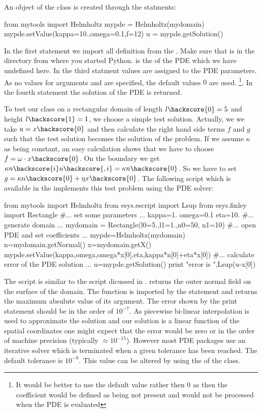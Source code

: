 An object of the  class is created through the statments:
\begin{python}
from mytools import Helmholtz
mypde = Helmholtz(mydomain)
mypde.setValue(kappa=10.,omega=0.1,f=12)
u = mypde.getSolution()
\end{python}
In the first statement we import all definition from the  . Make sure
that  is in the directory from where you started Python.
 is the \Domain of the PDE which we have undefined here. In the third statment values are
assigned to the PDE parameters. As no values for arguments  and  are
specified, the default values $0$ are used. \footnote{It would be better to use the default value 
 rather then $0$ as then the coefficient would be defined as being not present and
would not be processed when the PDE is evaluated}. In the fourth statement the solution of the
PDE is returned. 

To test our  class on a rectangular domain
of length $l\hackscore{0}=5$ and height $l\hackscore{1}=1$, we choose a simple test solution. Actually, we 
we take $u=x\hackscore{0}$ and then calculate the right hand side terms $f$ and $g$ such that
the test solution becomes the solution of the problem. If we assume $\kappa$ as being constant, 
an easy calculation shows that we have to choose $f=\omega \cdot x\hackscore{0}$. On the boundary we get
$\kappa n\hackscore{i} u\hackscore{,i}=\kappa n\hackscore{0}$.  
So we have to set $g=\kappa n\hackscore{0}+\eta x\hackscore{0}$. The following script  
 which is available in the \ExampleDirectory
implements this test problem using the \finley PDE solver:
\begin{python}
from mytools import Helmholtz
from esys.escript import Lsup
from esys.finley import Rectangle
#... set some parameters ...
kappa=1.
omega=0.1
eta=10.
#... generate domain ...
mydomain = Rectangle(l0=5.,l1=1.,n0=50, n1=10)
#... open PDE and set coefficients ...
mypde=Helmholtz(mydomain)
n=mydomain.getNormal()
x=mydomain.getX()
mypde.setValue(kappa,omega,omega*x[0],eta,kappa*n[0]+eta*x[0])
#... calculate error of the PDE solution ...
u=mypde.getSolution()
print "error is ",Lsup(u-x[0])
\end{python}
The script is similar to the script  dicussed in .
 returns the outer normal field on the surface of the domain. The function 
is imported by the  statement and returns the maximum absulute value of its argument. 
The error shown by the print statement should be in the order of $10^{-7}$. As piecewise bi-linear interpolation is
used to approximate the solution and our solution is a linear function of the spatial coordinates one might 
expect that the error would be zero or in the order of machine precision (typically $\approx 10^{-15}$). 
However most PDE packages use an iterative solver which is terminated
when a given tolerance has been reached. The default tolerance is $10^{-8}$. This value can be altered by using the 
 of the \LinearPDE class. 

